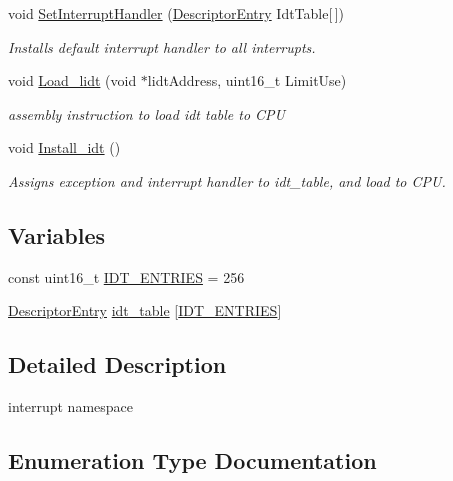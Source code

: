 \begin{DoxyCompactItemize}
void \hyperlink{namespace_i_n_t_r_p_abf09ee877603981fe255cd050cbbb110}{Set\+Interrupt\+Handler} (\hyperlink{union_i_n_t_r_p_1_1_descriptor_entry}{Descriptor\+Entry} Idt\+Table\mbox{[}$\,$\mbox{]})
\begin{DoxyCompactList}\small\item\em Installs default interrupt handler to all interrupts. \end{DoxyCompactList}\item 
void \hyperlink{namespace_i_n_t_r_p_a194f85d6c873615e9125466e3b23c30f}{Load\+\_\+lidt} (void $\ast$lidt\+Address, uint16\+\_\+t Limit\+Use)
\begin{DoxyCompactList}\small\item\em assembly instruction to load idt table to C\+PU \end{DoxyCompactList}\item 
void \hyperlink{namespace_i_n_t_r_p_a139b273cc1e45d3c2fdfe0d387a98518}{Install\+\_\+idt} ()
\begin{DoxyCompactList}\small\item\em Assigns exception and interrupt handler to idt\+\_\+table, and load to C\+PU. \end{DoxyCompactList}\end{DoxyCompactItemize}
\subsection*{Variables}
\begin{DoxyCompactItemize}
\item 
const uint16\+\_\+t \hyperlink{namespace_i_n_t_r_p_a1022b4dc1d9af1ea393f7f038ff421ce}{I\+D\+T\+\_\+\+E\+N\+T\+R\+I\+ES} = 256
\item 
\hyperlink{union_i_n_t_r_p_1_1_descriptor_entry}{Descriptor\+Entry} \hyperlink{namespace_i_n_t_r_p_a8e4e29dae90a4087ed1ac8cf845218c4}{idt\+\_\+table} \mbox{[}\hyperlink{namespace_i_n_t_r_p_a1022b4dc1d9af1ea393f7f038ff421ce}{I\+D\+T\+\_\+\+E\+N\+T\+R\+I\+ES}\mbox{]}
\end{DoxyCompactItemize}


\subsection{Detailed Description}
interrupt namespace 

\subsection{Enumeration Type Documentation}
\mbox{\label{namespace_i_n_t_r_p_a790699fb2953ef4ab70c7dc7148a1c94}} 
